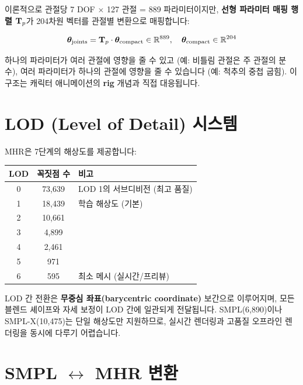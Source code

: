 \documentclass[11pt, a4paper]{report}
\begin{document}
이론적으로 관절당 7 DOF $\times$ 127 관절 = 889 파라미터이지만, \textbf{선형 파라미터 매핑 행렬} $\mathbf{T}_p$가 204차원 벡터를 관절별 변환으로 매핑합니다:

\begin{equation}
\bm{\theta}_{\text{joints}} = \mathbf{T}_p \cdot \bm{\theta}_{\text{compact}} \in \mathbb{R}^{889}, \quad \bm{\theta}_{\text{compact}} \in \mathbb{R}^{204}
\end{equation}

\begin{definition}[파라미터 매핑]
하나의 파라미터가 여러 관절에 영향을 줄 수 있고 (예: 비틀림 관절은 주 관절의 분수), 여러 파라미터가 하나의 관절에 영향을 줄 수 있습니다 (예: 척추의 중첩 굽힘). 이 구조는 캐릭터 애니메이션의 \textbf{rig} 개념과 직접 대응됩니다.
\end{definition}


\section{LOD (Level of Detail) 시스템}

MHR은 7단계의 해상도를 제공합니다:

\begin{center}
\renewcommand{\arraystretch}{1.2}
\begin{tabular}{ccl}
\toprule
\textbf{LOD} & \textbf{꼭짓점 수} & \textbf{비고} \\
\midrule
0 & 73,639 & LOD 1의 서브디비전 (최고 품질) \\
1 & 18,439 & 학습 해상도 (기본) \\
2 & 10,661 & \\
3 & 4,899 & \\
4 & 2,461 & \\
5 & 971 & \\
6 & 595 & 최소 메시 (실시간/프리뷰) \\
\bottomrule
\end{tabular}
\end{center}

LOD 간 전환은 \textbf{무중심 좌표(barycentric coordinate)} 보간으로 이루어지며, 모든 블렌드 셰이프와 자세 보정이 LOD 간에 일관되게 전달됩니다. SMPL(6,890)이나 SMPL-X(10,475)는 단일 해상도만 지원하므로, 실시간 렌더링과 고품질 오프라인 렌더링을 동시에 다루기 어렵습니다.


\section{SMPL $\leftrightarrow$ MHR 변환}
\end{document}
